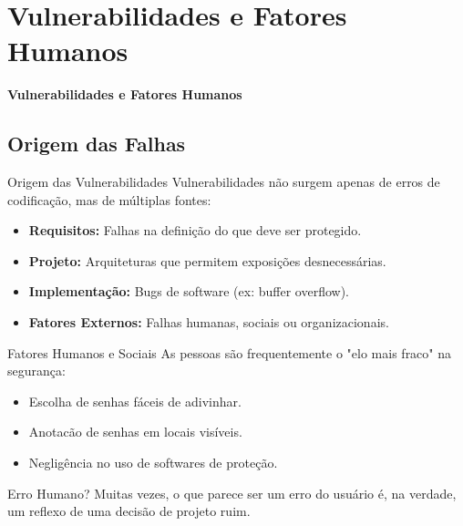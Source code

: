 \documentclass[aspectratio=169]{beamer}
\begin{document}
\section{Vulnerabilidades e Fatores Humanos}
{
\begin{frame}[plain]
    \centering
    \Huge \color{white} \bfseries Vulnerabilidades e Fatores Humanos
\end{frame}
}

\subsection{Origem das Falhas}
\begin{frame}{Origem das Vulnerabilidades}
    Vulnerabilidades não surgem apenas de erros de codificação, mas de múltiplas fontes:
    \begin{itemize}
        \item \textbf{Requisitos:} Falhas na definição do que deve ser protegido.
        \item \textbf{Projeto:} Arquiteturas que permitem exposições desnecessárias.
        \item \textbf{Implementação:} Bugs de software (ex: buffer overflow).
        \item \textbf{Fatores Externos:} Falhas humanas, sociais ou organizacionais.
    \end{itemize}
    \centering
\end{frame}

\begin{frame}{Fatores Humanos e Sociais}
    As pessoas são frequentemente o "elo mais fraco" na segurança:
    \begin{itemize}
        \item Escolha de senhas fáceis de adivinhar.
        \item Anotacão de senhas em locais visíveis.
        \item Negligência no uso de softwares de proteção.
    \end{itemize}
    \begin{block}{Erro Humano?}
        Muitas vezes, o que parece ser um erro do usuário é, na verdade, um reflexo de uma decisão de projeto ruim.
    \end{block}
\end{frame}
\end{document}
